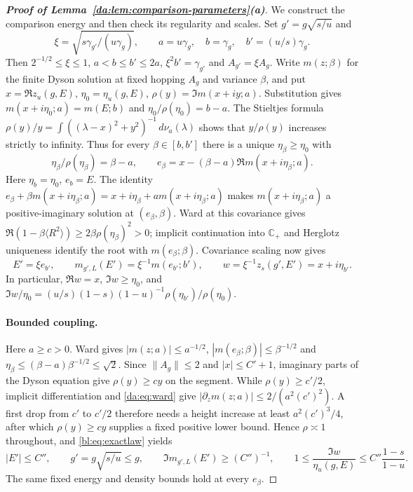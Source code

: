 \documentclass[11pt]{article}
\numberwithin{equation}{section}
\theoremstyle{remark}
\newcommand{\C}{\mathbb C}
\begin{document}
\begin{proof}[\textbf{Proof of Lemma~\ref{da:lem:comparison-parameters}(a)}]
We construct the comparison energy and then check its regularity and scales.
Set $g'=g\sqrt{s/u}$ and
\[
 \xi=\sqrt{s\gamma_{g'}/(u\gamma_g)},\qquad
 a=u\gamma_g,\quad b=\gamma_g,\quad b'=(u/s)\gamma_g.
\]
Then $2^{-1/2}\le\xi\le1$, $a<b\le b'\le2a$,
$\xi^2b'=\gamma_{g'}$ and $A_{g'}=\xi A_g$.
Write $m(z;\beta)$ for the finite Dyson solution at fixed hopping
$A_g$ and variance $\beta$, and put
$x=\Re z_u(g,E)$, $\eta_0=\eta_u(g,E)$,
$\rho(y)=\Im m(x+iy;a)$.
Substitution gives $m(x+i\eta_0;a)=m(E;b)$ and
$\eta_0/\rho(\eta_0)=b-a$.
The Stieltjes formula
$\rho(y)/y=\int((\lambda-x)^2+y^2)^{-1}\,d\nu_a(\lambda)$
shows that $y/\rho(y)$ increases strictly to infinity. Thus for every
$\beta\in[b,b']$ there is a unique $\eta_\beta\ge\eta_0$ with
\begin{equation}\label{bl:eq:tube}
 \eta_\beta/\rho(\eta_\beta)=\beta-a,\qquad
 e_\beta=x-(\beta-a)\Re m(x+i\eta_\beta;a).
\end{equation}
Here $\eta_b=\eta_0$, $e_b=E$. The identity
$e_\beta+\beta m(x+i\eta_\beta;a)
=x+i\eta_\beta+a m(x+i\eta_\beta;a)$ makes
$m(x+i\eta_\beta;a)$ a positive-imaginary solution at $(e_\beta,\beta)$.
Ward at this covariance gives
$\Re(1-\beta\langle R^2\rangle)\ge2\beta\rho(\eta_\beta)^2>0$;
implicit continuation into $\C_+$ and Herglotz uniqueness identify the
root with $m(e_\beta;\beta)$. Covariance scaling now gives
\begin{equation}\label{bl:eq:exactlaw}
 E'=\xi e_{b'},\qquad m_{g',L}(E')=\xi^{-1}m(e_{b'};b'),\qquad
 w=\xi^{-1}z_s(g',E')=x+i\eta_{b'}.
\end{equation}
In particular, $\Re w=x$, $\Im w\ge\eta_0$, and
$\Im w/\eta_0=(u/s)(1-s)(1-u)^{-1}
\rho(\eta_{b'})/\rho(\eta_0)$.

\paragraph{Bounded coupling.}
Here $a\ge c>0$. Ward gives $|m(z;a)|\le a^{-1/2}$,
$|m(e_\beta;\beta)|\le\beta^{-1/2}$ and
$\eta_\beta\le(\beta-a)\beta^{-1/2}\le\sqrt2$.
Since $\|A_g\|\le2$ and $|x|\le C'+1$, imaginary parts of the
Dyson equation give $\rho(y)\ge cy$ on the segment. While
$\rho(y)\ge c'/2$, implicit differentiation and \eqref{da:eq:ward} give
$|\partial_zm(z;a)|\le2/(a^2(c')^2)$.
A first drop from $c'$ to $c'/2$ therefore needs a height increase
at least $a^2(c')^3/4$, after which $\rho(y)\ge cy$ supplies a fixed
positive lower bound. Hence $\rho\asymp1$ throughout, and
\eqref{bl:eq:exactlaw} yields
\begin{equation}\label{bl:eq:backbuffer}
 |E'|\le C'',\qquad g'=g\sqrt{s/u}\le g,\qquad
 \Im m_{g',L}(E')\ge(C'')^{-1},\qquad
 1\le\frac{\Im w}{\eta_u(g,E)}\le C''\frac{1-s}{1-u}.
\end{equation}
The same fixed energy and density bounds hold at every $e_\beta$.


\end{proof}
\end{document}
